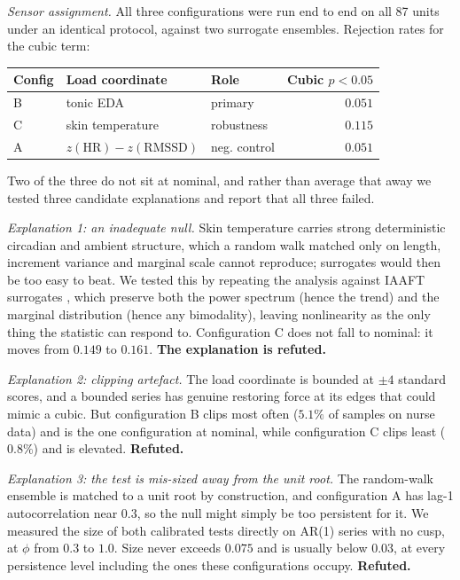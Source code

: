\documentclass[conference]{IEEEtran}
\begin{document}
\emph{Sensor assignment.} All three configurations were run end to end on all
87 units under an identical protocol, against two surrogate ensembles.
Rejection rates for the cubic term:

\begin{center}
\footnotesize
\begin{tabular}{@{}l l l r@{}}
\toprule
Config & Load coordinate & Role & Cubic $p<0.05$ \\
\midrule
B & tonic EDA & primary & $0.051$ \\
C & skin temperature & robustness & $0.115$ \\
A & $z(\mathrm{HR}){-}z(\mathrm{RMSSD})$ & neg. control & $0.051$ \\
\bottomrule
\end{tabular}
\end{center}

Two of the three do not sit at nominal, and rather than average that away we
tested three candidate explanations and report that all three failed.

\emph{Explanation 1: an inadequate null.} Skin temperature carries strong
deterministic circadian and ambient structure, which a random walk matched only
on length, increment variance and marginal scale cannot reproduce; surrogates
would then be too easy to beat. We tested this by repeating the analysis
against IAAFT surrogates \cite{schreiber1996}, which preserve both the power
spectrum (hence the trend) and the marginal distribution (hence any
bimodality), leaving nonlinearity as the only thing the statistic can respond
to. Configuration C does not fall to nominal: it moves from $0.149$ to $0.161$.
\textbf{The explanation is refuted.}

\emph{Explanation 2: clipping artefact.} The load coordinate is bounded at
$\pm4$ standard scores, and a bounded series has genuine restoring force at its
edges that could mimic a cubic. But configuration B clips most often
($5.1\%$ of samples on nurse data) and is the one configuration at nominal,
while configuration C clips least ($0.8\%$) and is elevated. \textbf{Refuted.}

\emph{Explanation 3: the test is mis-sized away from the unit root.} The
random-walk ensemble is matched to a unit root by construction, and
configuration A has lag-1 autocorrelation near $0.3$, so the null might simply
be too persistent for it. We measured the size of both calibrated tests
directly on AR(1) series with no cusp, at $\phi$ from $0.3$ to $1.0$. Size
never exceeds $0.075$ and is usually below $0.03$, at every persistence level
including the ones these configurations occupy. \textbf{Refuted.}
\end{document}

